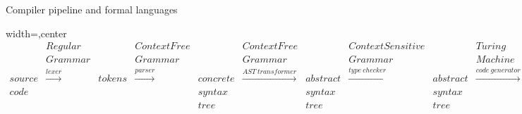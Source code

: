 \documentclass{beamer}
\begin{document}

\begin{frame}{Compiler pipeline and formal languages}

\begin{adjustbox}{width=\textwidth,center}
$\begin{array}{ccccccccccccc}
        & Regular         &        & Context Free &          & Context Free         &          & Context Sensitive &          & Turing              &         & Turing & \\
	& Grammar         &        & Grammar       &          & Grammar              &          & Grammar           &          & Machine             &         & Machine & \\
source  & \xrightarrow{lexer} & tokens & \xrightarrow{parser}  & concrete & \xrightarrow{AST \ transformer} & abstract & \xrightarrow{type \ checker} & abstract & \xrightarrow{code \ generator} & machine & \xrightarrow{optimizer} & optimized \\
code    &                 &        &              & syntax   &                      & syntax   &                   & syntax   &                     & code    & & machine \\
        &                 &        &              & tree     &                      & tree     &                   & tree     &                     &         & & code
\end{array}$
\end{adjustbox}

\end{frame}

\end{document}
